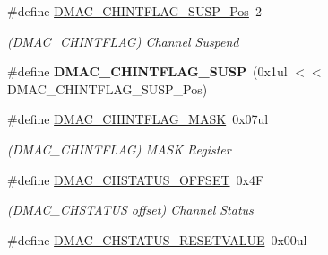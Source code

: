 \begin{DoxyCompactItemize}
\item 
\hypertarget{group___s_a_m_l21___d_m_a_c_gabe5118389e9e2d3b469d6904cf19e3ce}{}\#define \hyperlink{group___s_a_m_l21___d_m_a_c_gabe5118389e9e2d3b469d6904cf19e3ce}{D\+M\+A\+C\+\_\+\+C\+H\+I\+N\+T\+F\+L\+A\+G\+\_\+\+S\+U\+S\+P\+\_\+\+Pos}~2\label{group___s_a_m_l21___d_m_a_c_gabe5118389e9e2d3b469d6904cf19e3ce}

\begin{DoxyCompactList}\small\item\em (D\+M\+A\+C\+\_\+\+C\+H\+I\+N\+T\+F\+L\+A\+G) Channel Suspend \end{DoxyCompactList}\item 
\hypertarget{group___s_a_m_l21___d_m_a_c_ga69acb0cd63ab94f4ec4d997252643a6c}{}\#define {\bfseries D\+M\+A\+C\+\_\+\+C\+H\+I\+N\+T\+F\+L\+A\+G\+\_\+\+S\+U\+S\+P}~(0x1ul $<$$<$ D\+M\+A\+C\+\_\+\+C\+H\+I\+N\+T\+F\+L\+A\+G\+\_\+\+S\+U\+S\+P\+\_\+\+Pos)\label{group___s_a_m_l21___d_m_a_c_ga69acb0cd63ab94f4ec4d997252643a6c}

\item 
\hypertarget{group___s_a_m_l21___d_m_a_c_ga3e4ed8ac63e8c507d988be35b86628fc}{}\#define \hyperlink{group___s_a_m_l21___d_m_a_c_ga3e4ed8ac63e8c507d988be35b86628fc}{D\+M\+A\+C\+\_\+\+C\+H\+I\+N\+T\+F\+L\+A\+G\+\_\+\+M\+A\+S\+K}~0x07ul\label{group___s_a_m_l21___d_m_a_c_ga3e4ed8ac63e8c507d988be35b86628fc}

\begin{DoxyCompactList}\small\item\em (D\+M\+A\+C\+\_\+\+C\+H\+I\+N\+T\+F\+L\+A\+G) M\+A\+S\+K Register \end{DoxyCompactList}\item 
\hypertarget{group___s_a_m_l21___d_m_a_c_gabe54ae70458b70c71055302e6ade7254}{}\#define \hyperlink{group___s_a_m_l21___d_m_a_c_gabe54ae70458b70c71055302e6ade7254}{D\+M\+A\+C\+\_\+\+C\+H\+S\+T\+A\+T\+U\+S\+\_\+\+O\+F\+F\+S\+E\+T}~0x4\+F\label{group___s_a_m_l21___d_m_a_c_gabe54ae70458b70c71055302e6ade7254}

\begin{DoxyCompactList}\small\item\em (D\+M\+A\+C\+\_\+\+C\+H\+S\+T\+A\+T\+U\+S offset) Channel Status \end{DoxyCompactList}\item 
\hypertarget{group___s_a_m_l21___d_m_a_c_ga5a6f9ee2bfaa056b04257dd388cdf25a}{}\#define \hyperlink{group___s_a_m_l21___d_m_a_c_ga5a6f9ee2bfaa056b04257dd388cdf25a}{D\+M\+A\+C\+\_\+\+C\+H\+S\+T\+A\+T\+U\+S\+\_\+\+R\+E\+S\+E\+T\+V\+A\+L\+U\+E}~0x00ul\label{group___s_a_m_l21___d_m_a_c_ga5a6f9ee2bfaa056b04257dd388cdf25a}


\end{DoxyCompactItemize}
